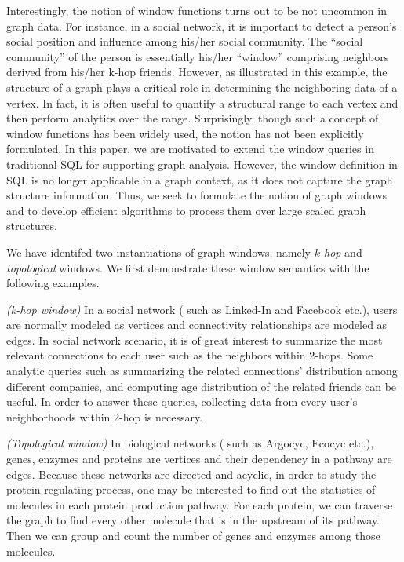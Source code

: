 Interestingly, the notion of window functions turns out to be not uncommon
in graph data. For instance, in a social network, it is important to detect 
a person's social position and influence among his/her social community. 
The ``social community'' of the person is essentially his/her ``window'' 
comprising neighbors derived from his/her k-hop friends.
However, as illustrated in this example, the structure of a graph
plays a critical role in determining the neighboring data of a vertex.
In fact, it is often useful to quantify a structural range to each vertex 
and then perform analytics over the range. 
Surprisingly, though such a concept of window functions has been widely
used, the notion has not been explicitly formulated. 
In this paper, we are motivated to extend the window queries in traditional 
SQL for supporting graph analysis. However, the window definition in 
SQL is no longer applicable in a graph context, as it does not capture 
the graph structure information.
Thus, we seek to formulate the notion of graph windows and to develop
efficient algorithms to process them over large scaled graph structures. 

We have identifed two instantiations of graph windows, namely 
$k${\em -hop} and {\em topological} windows. 
We first demonstrate these window semantics with the following examples. 
\begin{example}
\label{query:linkedin-2-hop-window}
\emph{(k-hop window)} In a social network ( such as Linked-In and Facebook etc.), users are normally modeled as vertices and connectivity relationships are modeled as edges. In social network scenario, it is of great interest to summarize the most relevant connections to each user such as the neighbors within 2-hops. Some analytic queries such as summarizing the related connections' distribution among different companies, and computing age distribution of the related friends can be useful. In order to answer these queries, collecting data from every user's neighborhoods within 2-hop is necessary.
\end{example}

\begin{example}
\label{query:bio-dag-window}
\emph{(Topological window)} In biological networks ( such as Argocyc, Ecocyc etc.\cite{keseler2005ecocyc}), genes, enzymes and proteins are vertices and their dependency in a pathway are edges. Because these networks are directed 
and acyclic, in order to study the protein regulating process, one may be 
interested to find out the statistics of molecules in each protein 
production pathway. For each protein, we can traverse the graph to find 
every other molecule that is in the upstream of its pathway. Then we can group and count the number of genes and enzymes among those molecules. 
\end{example}


